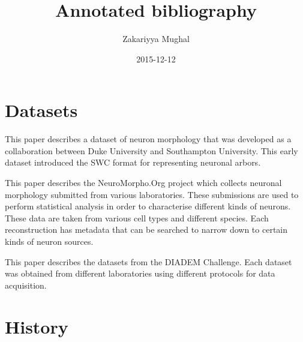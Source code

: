\documentclass[12pt]{article}
\title{Annotated bibliography}
\author{Zakariyya Mughal}
\date{2015-12-12}
\begin{document}
\singlespacing
\maketitle
\tableofcontents


\section{Datasets}

\begin{enumerate}[label={}]
			This paper describes a dataset of neuron
			morphology that was developed as a
			collaboration between Duke University and
			Southampton University. This early dataset
			introduced the SWC format for representing
			neuronal arbors.

			This paper describes the
			NeuroMorpho.Org project which collects
			neuronal morphology submitted from various
			laboratories. These submissions are used
			to perform statistical analysis in order
			to characterise different kinds of
			neurons. These data are taken from various
			cell types and different species. Each
			reconstruction has metadata that can be
			searched to narrow down to certain kinds
			of neuron sources.

			This paper describes the datasets from the
			DIADEM Challenge. Each dataset was
			obtained from different laboratories using
			different protocols for data acquisition.
\end{enumerate}

\section{History}
\end{document}
